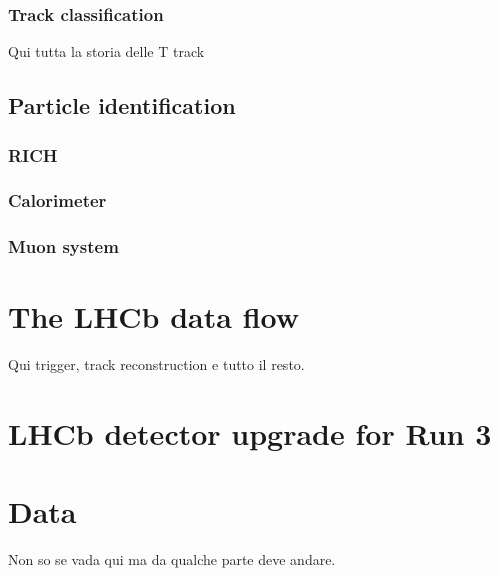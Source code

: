 \subsubsection{Track classification}
Qui tutta la storia delle T track

\subsection{Particle identification}

\subsubsection{RICH}

\subsubsection{Calorimeter}

\subsubsection{Muon system}

\section{The LHCb data flow}
Qui trigger, track reconstruction e tutto il resto.

\section{LHCb detector upgrade for Run 3}

\section{Data}
Non so se vada qui ma da qualche parte deve andare.